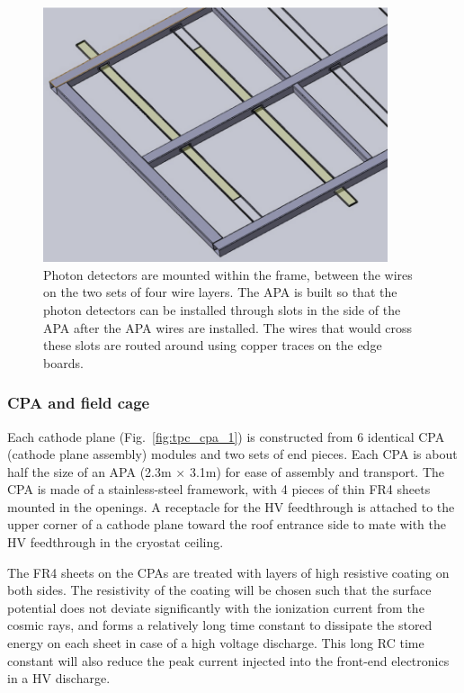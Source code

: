 \begin{figure}[t]
  \centering
\includegraphics[width=4in]{figures/TPC_APA_3}
  \caption{Photon detectors are mounted within the frame, between the wires on the two sets of four wire layers.  The APA is built so that the photon detectors can be installed through slots in the side of the APA after the APA wires are installed.  The wires that would cross these slots are routed around using copper traces on the edge boards.}
\label{fig:pd_insertion}
\end{figure}


\subsubsection{CPA and field cage}



Each cathode plane (Fig.~\ref{fig:tpc_cpa_1}) is constructed from 6 identical CPA (cathode plane assembly) modules and two sets of end pieces. Each CPA is about half the size of an APA  (2.3m $\times$ 3.1m) for ease of assembly and transport.  The CPA is made of a stainless-steel framework, 
with 4 pieces of thin FR4 sheets mounted in the openings.  A receptacle for the HV feedthrough is attached to the upper corner of a cathode plane toward the roof entrance side to mate with the HV feedthrough in the cryostat ceiling. 

The FR4 sheets on the CPAs are treated with layers of high resistive coating on both sides.  The resistivity of the coating will be chosen such that the surface potential does not deviate significantly with the ionization current from the cosmic rays, and forms a relatively long time constant to dissipate the stored energy on each sheet in case of a high voltage discharge.  This long RC time constant will also reduce the peak current injected into the front-end electronics in a HV discharge.

